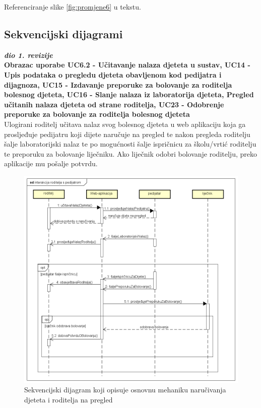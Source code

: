 					Referenciranje slike \ref{fig:promjene6} u tekstu.
					
				
			\subsection{Sekvencijski dijagrami}
				
				\textbf{\textit{dio 1. revizije}}\\
				
					\textbf{Obrazac uporabe UC6.2 - Učitavanje nalaza djeteta u sustav, UC14 - Upis podataka o pregledu djeteta obavljenom kod pedijatra i dijagnoza, UC15 - Izdavanje preporuke za bolovanje za roditelja bolesnog djeteta, UC16 - Slanje nalaza iz laboratorija djeteta, Pregled učitanih nalaza djeteta od strane roditelja, UC23 - Odobrenje preporuke za bolovanje za roditelja bolesnog djeteta}\\
				
				
				Ulogirani roditelj učitava nalaz svog bolesnog djeteta u web aplikaciju koja ga prosljeđuje pedijatru koji dijete naručuje na pregled te nakon pregleda roditelju šalje laboratorijski nalaz te po mogućnosti šalje ispričnicu za školu/vrtić roditelju te preporuku za bolovanje liječniku. Ako liječnik odobri bolovanje roditelju, preko aplikacije mu pošalje potvrdu.
				
				\begin{figure}[H]
					\includegraphics[width=\textwidth]{dijagrami/SDrplW.PNG} %
					\caption{Sekvencijski dijagram koji opisuje osnovnu mehaniku naručivanja djeteta i roditelja na pregled}
					\label{fig:promjene7} %
				\end{figure}
				
